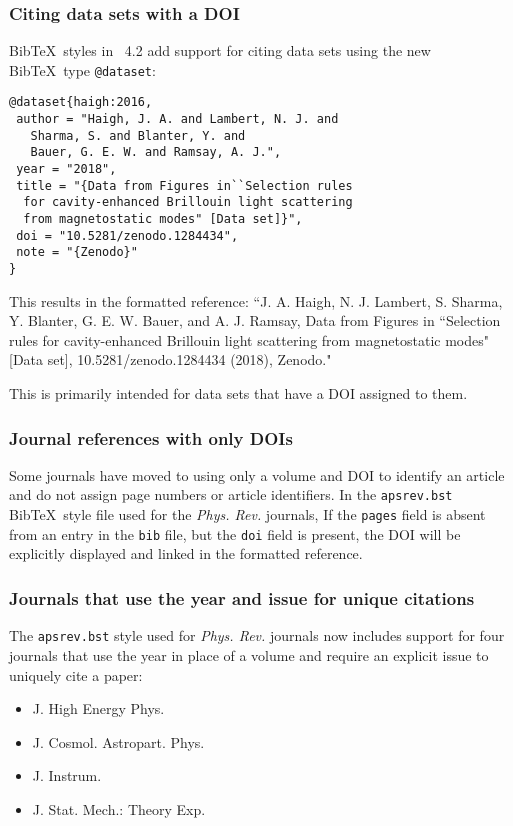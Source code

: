 \documentclass[%
,aps%
 ,twocolumn%
 ,secnumarabic%
,amssymb, amsmath,nobibnotes, aps, prl, floatfix]{revtex4-2}
\begin{document}
\subsubsection{\label{sec:datacitations}Citing data sets with a DOI}
Bib\TeX\ styles in \revtex~4.2 add support for citing data sets using the new Bib\TeX\ type \texttt{@dataset}:

\begin{verbatim}
@dataset{haigh:2016,
 author = "Haigh, J. A. and Lambert, N. J. and 
   Sharma, S. and Blanter, Y. and
   Bauer, G. E. W. and Ramsay, A. J.",
 year = "2018",
 title = "{Data from Figures in``Selection rules 
  for cavity-enhanced Brillouin light scattering
  from magnetostatic modes" [Data set]}",
 doi = "10.5281/zenodo.1284434",
 note = "{Zenodo}"
}
\end{verbatim}
This results in the formatted reference: ``J. A. Haigh, N. J. Lambert, S. Sharma, Y. Blanter, G. E. W. Bauer, and A. J. Ramsay, Data from Figures in ``Selection
rules for cavity-enhanced Brillouin light scattering from magnetostatic modes" [Data set], 10.5281/zenodo.1284434 (2018),
Zenodo."

This is primarily intended for data sets that have a DOI assigned to them.

\subsubsection{\label{sec:doiref}Journal references with only DOIs}
Some journals have moved to using only a volume and DOI to identify an article and do not assign page numbers or article identifiers. In the \texttt{apsrev.bst} Bib\TeX\ style file used for the \textit{Phys. Rev.} journals, If the \texttt{pages} field is absent from an entry in the \texttt{bib} file, but the \texttt{doi} field is present, the DOI will be explicitly displayed and linked in the formatted reference.

\subsubsection{\label{sec:jhep}Journals that use the year and issue for unique citations}
The \texttt{apsrev.bst} style used for \textit{Phys. Rev.} journals now includes support for four journals that use the year in place of a volume and require an explicit issue to uniquely cite a paper:

\begin{itemize}
 \item J. High Energy Phys.
 \item J. Cosmol. Astropart. Phys.
 \item J. Instrum.
 \item J. Stat. Mech.: Theory Exp.
 \end{itemize}
 
\end{document}
